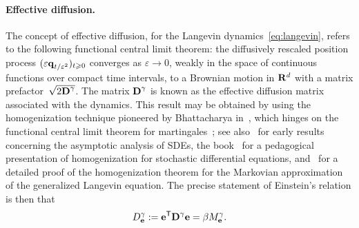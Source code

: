 \documentclass[11pt,a4paper]{article}
\begin{document}

\paragraph{Effective diffusion.}
The concept of effective diffusion,
for the Langevin dynamics~\eqref{eq:langevin},
refers to the following functional central limit theorem:
the diffusively rescaled position process $(\varepsilon \boldsymbol{\mathbf q}_{t/\varepsilon^2})_{t\geqslant0}$ converges as $\varepsilon \to 0$,
weakly in the space of continuous functions over compact time intervals,
to a Brownian motion in $\mathbf R^d$ with a matrix prefactor~$\sqrt{2 \boldsymbol{\mathbf D}^{\gamma}}$.
The matrix $\boldsymbol{\mathbf D}^{\gamma}$ is known as the effective diffusion matrix associated with the dynamics.
This result may be obtained by using the homogenization technique pioneered by Bhattacharya in~\cite{MR663900},
which hinges on the functional central limit theorem for martingales~\cite{MR668684};
see also~\cite[Chapter~3]{MR503330} for early results concerning the asymptotic analysis of SDEs,
the book~\cite[Chapter 18]{pavliotis2008multiscale} for a pedagogical presentation of homogenization for stochastic differential equations,
and~\cite[Theorem 2.5]{MR2793823} for a detailed proof of the homogenization theorem for the Markovian approximation of the generalized Langevin equation.
The precise statement of Einstein's relation is then that
\[
    D^{\gamma}_{\boldsymbol{\mathbf e}} := \boldsymbol{\mathbf e}^\mathsf T \boldsymbol{\mathbf D}^{\gamma} \boldsymbol{\mathbf e} = \beta M^{\gamma}_{\boldsymbol{\mathbf e}}.
\]
\end{document}
